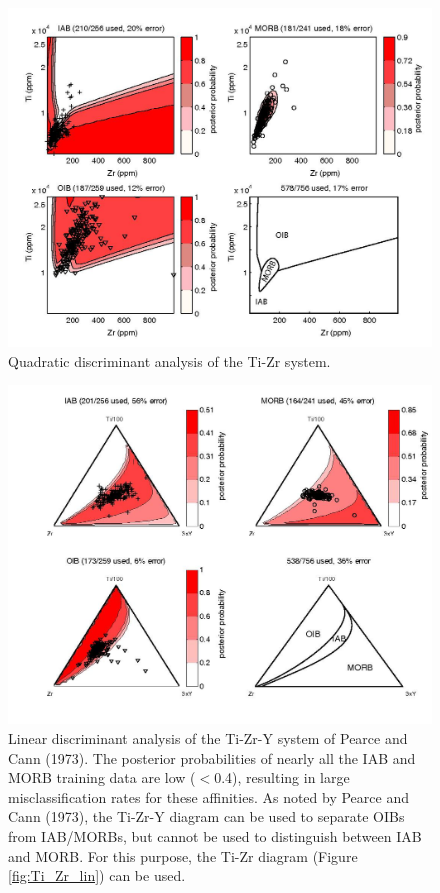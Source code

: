 \begin{figure}[htbp]
  \centering
  \includegraphics[width=600]{figures/Ti_Zr_quad.jpg}
  \caption[Quadratic discriminant analysis of the Ti-Zr system]
{Quadratic discriminant analysis of the Ti-Zr system.}
  \label{fig:Ti_Zr_quad}
\end{figure}

\begin{figure}[htbp]
  \centering
  \includegraphics[width=600]{figures/Ti_Zr_Y_lin.jpg}
  \caption[Linear discriminant analysis of the Ti-Zr-Y system of Pearce and Cann (1973)]
{Linear discriminant analysis of the Ti-Zr-Y system of Pearce and Cann
(1973).  The  posterior probabilities of  nearly all the IAB  and MORB
training data  are low ($<$0.4), resulting  in large misclassification
rates for  these affinities. As noted  by Pearce and  Cann (1973), the
Ti-Zr-Y  diagram can  be used  to  separate OIBs  from IAB/MORBs,  but
cannot be used to distinguish  between IAB and MORB. For this purpose,
the Ti-Zr diagram (Figure \ref{fig:Ti_Zr_lin}) can be used.}
  \label{fig:Ti_Zr_Y_lin}
\end{figure}

